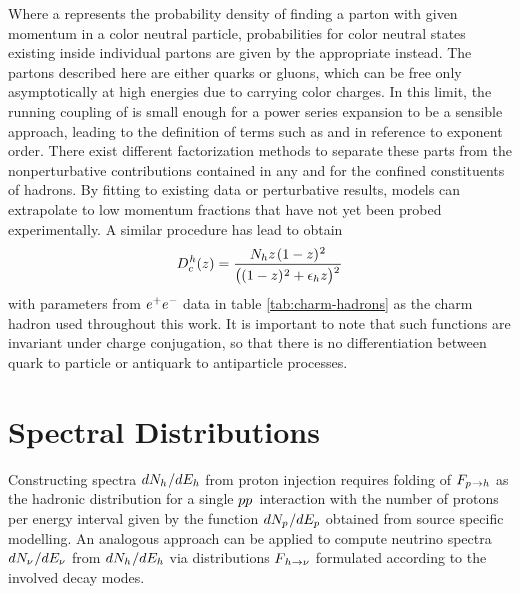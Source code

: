 Where a  represents the probability density of finding a parton with given momentum in a color neutral particle,
probabilities for color neutral states existing inside individual partons are given by the appropriate  instead.
The partons described here are either quarks or gluons, which can be free only asymptotically at high energies due to carrying
color charges. In this limit, the running coupling of  is small enough for a power series expansion to be a sensible
approach, leading to the definition of terms such as  and  in reference to exponent order. There exist
different factorization methods to separate these parts from the nonperturbative contributions contained in any  and
 for the confined constituents of hadrons. By fitting to existing data or perturbative results, models can extrapolate to
low momentum fractions that have not yet been probed experimentally. A similar procedure has lead \cite{Kniehl_2006} to obtain
\begin{equation}
	D^{\kern+0.5pt h}_{c}(z) = \frac{N_h z \kern+1.0pt (1 - z)^{\kern+0.5pt 2}}
	{\bigl((1 - z)^{\kern+0.5pt 2} + \epsilon_h z \bigl)^{\raisebox{-1.5ex}{$^2$}}}
	\label{eqn:fragmentation}
\end{equation}
with parameters from $\kern+0.5pt e^+e^- \kern-0.8pt$ data in table \ref{tab:charm-hadrons} as the charm hadron  used
throughout this work. It is important to note that such functions are invariant under charge conjugation, so that there is no
differentiation between quark to particle or antiquark to antiparticle processes.



\section{Spectral Distributions}
\label{sec:spectral}

Constructing spectra $dN_h \kern+0.5pt / dE_h$ from proton injection requires folding of $F_{p \kern+0.8pt \rightarrow h}$ as
the hadronic distribution for a single $p \kern-0.1pt p \kern+0.9pt$ interaction with the number of protons per energy interval
given by the function $dN_p \kern+0.6pt / dE_p$ obtained from source specific modelling. An analogous approach can be applied to
compute neutrino spectra $dN_\nu \kern+0.6pt / dE_\nu$ from $dN_h \kern+0.5pt / dE_h$ via distributions
$F_{\kern+1.0pt h \kern+0.2pt \rightarrow \nu}$ formulated according to the involved decay modes.



